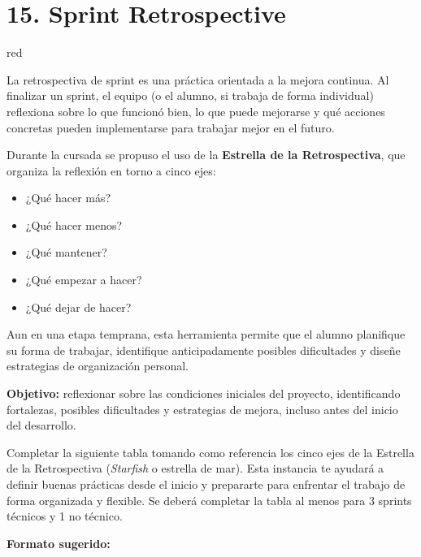 \documentclass[
11pt, %
]{charter}
\begin{document}
\section{15. Sprint Retrospective}    
\label{sec:sprint_retro}

\begin{consigna}{red} %

La retrospectiva de sprint es una práctica orientada a la mejora continua. Al finalizar un sprint, el equipo (o el alumno, si trabaja de forma individual) reflexiona sobre lo que funcionó bien, lo que puede mejorarse y qué acciones concretas pueden implementarse para trabajar mejor en el futuro.

Durante la cursada se propuso el uso de la \textbf{Estrella de la Retrospectiva}, que organiza la reflexión en torno a cinco ejes:

\begin{itemize}
\item  ¿Qué hacer más?
\item  ¿Qué hacer menos?
\item  ¿Qué mantener?
\item  ¿Qué empezar a hacer?
\item  ¿Qué dejar de hacer?
\end{itemize}

Aun en una etapa temprana, esta herramienta permite que el alumno planifique su forma de trabajar, identifique anticipadamente posibles dificultades y diseñe estrategias de organización personal.

\textbf{Objetivo:} reflexionar sobre las condiciones iniciales del proyecto, identificando fortalezas, posibles dificultades y estrategias de mejora, incluso antes del inicio del desarrollo.


Completar la siguiente tabla tomando como referencia los cinco ejes de la Estrella de la Retrospectiva (\emph{Starfish} o estrella de mar). Esta instancia te ayudará a definir buenas prácticas desde el inicio y prepararte para enfrentar el trabajo de forma organizada y flexible. Se deberá completar la tabla al menos para 3 sprints técnicos y 1 no técnico.

\textbf{Formato sugerido:}


\end{consigna}
\end{document}
